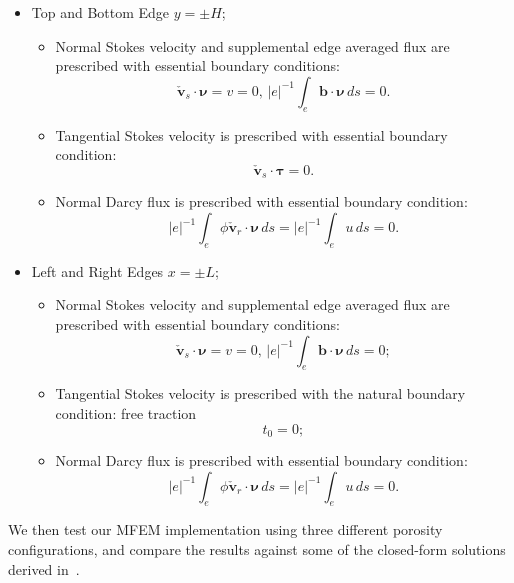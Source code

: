 \begin{itemize}
		  \item Top and Bottom Edge $y=\pm H$;
					 \begin{itemize}
								\item Normal Stokes velocity and supplemental edge averaged flux are prescribed with essential boundary conditions:
						  \begin{equation*}
									 \check{\mathbf{v}}_s \cdot \pmb{\nu} = v = 0,\, \lvert e \rvert^{-1}\int_e \mathbf{b}\cdot \pmb{\nu}\, ds = 0.
						  \end{equation*}
				\item Tangential Stokes velocity is prescribed with essential boundary condition:
						  \begin{equation*}
									 \check{\mathbf{v}}_s \cdot \pmb{\tau} = 0.
						  \end{equation*}
								\item Normal Darcy flux is prescribed with essential boundary condition:
										  \begin{equation*}
													 \lvert e \rvert^{-1} \int_e \phi\check{\mathbf{v}}_r\cdot \pmb{\nu}\, ds = \lvert e \rvert^{-1} \int_e u\, ds = 0.
										  \end{equation*}
					 \end{itemize}
		  \item Left and Right Edges $x=\pm L$;
					 \begin{itemize}
								\item Normal Stokes velocity and supplemental edge averaged flux are prescribed with essential boundary conditions:
						  \begin{equation*}
									 \check{\mathbf{v}}_s \cdot \pmb{\nu} = v = 0,\, \lvert e \rvert^{-1}\int_e \mathbf{b}\cdot \pmb{\nu}\, ds = 0;
						  \end{equation*}
				\item Tangential Stokes velocity is prescribed with the natural boundary condition: free traction
						  \begin{equation*}
									 t_0 = 0;
						  \end{equation*}
								\item Normal Darcy flux is prescribed with essential boundary condition:
										  \begin{equation*}
													 \lvert e \rvert^{-1} \int_e \phi\check{\mathbf{v}}_r\cdot \pmb{\nu}\, ds = \lvert e \rvert^{-1} \int_e u\, ds = 0.
										  \end{equation*}
					 \end{itemize}
\end{itemize}
We then test our MFEM implementation using three different porosity configurations,
and compare the results against some of the closed-form solutions 
derived in~\cite{DegenerateDarcy}.

